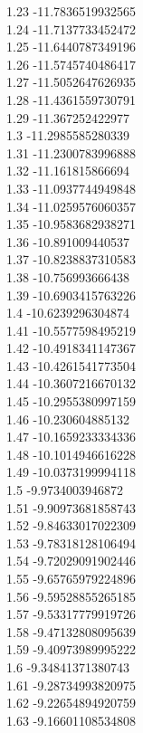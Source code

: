 {1.23	-11.7836519932565\\
1.24	-11.7137733452472\\
1.25	-11.6440787349196\\
1.26	-11.5745740486417\\
1.27	-11.5052647626935\\
1.28	-11.4361559730791\\
1.29	-11.367252422977\\
1.3	-11.2985585280339\\
1.31	-11.2300783996888\\
1.32	-11.161815866694\\
1.33	-11.0937744949848\\
1.34	-11.0259576060357\\
1.35	-10.9583682938271\\
1.36	-10.891009440537\\
1.37	-10.8238837310583\\
1.38	-10.756993666438\\
1.39	-10.6903415763226\\
1.4	-10.6239296304874\\
1.41	-10.5577598495219\\
1.42	-10.4918341147367\\
1.43	-10.4261541773504\\
1.44	-10.3607216670132\\
1.45	-10.2955380997159\\
1.46	-10.230604885132\\
1.47	-10.1659233334336\\
1.48	-10.1014946616228\\
1.49	-10.0373199994118\\
1.5	-9.9734003946872\\
1.51	-9.90973681858743\\
1.52	-9.84633017022309\\
1.53	-9.78318128106494\\
1.54	-9.72029091902446\\
1.55	-9.65765979224896\\
1.56	-9.59528855265185\\
1.57	-9.53317779919726\\
1.58	-9.47132808095639\\
1.59	-9.40973989995222\\
1.6	-9.34841371380743\\
1.61	-9.28734993820975\\
1.62	-9.22654894920759\\
1.63	-9.16601108534808\\
}
